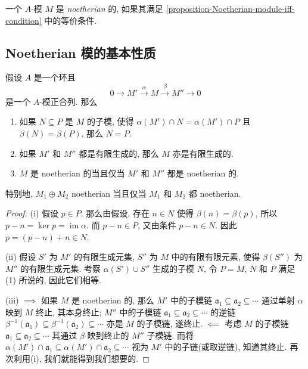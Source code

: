 一个 \( A \)-模 \( M \) 是 \emph{noetherian} 的, 如果其满足
\cref{proposition-Noetherian-module-iff-condition} 中的等价条件.

\subsection{Noetherian 模的基本性质}

\begin{proposition}
  \label{proposition-exact-sequence-noetherian-module}
  假设 \( A \) 是一个环且
  \[
    0 \to M' \xrightarrow{\alpha} M \xrightarrow{\beta} M'' \to 0
  \]
  是一个 \( A \)-模正合列. 那么
  \begin{enumerate}
    \item 如果 \( N \subseteq P \) 是 \( M \) 的子模, 使得 \( \alpha(M') \cap N
      = \alpha(M') \cap P \) 且 \( \beta(N) = \beta(P) \), 那么 \( N = P \).
    \item 如果 \( M' \) 和 \( M'' \) 都是有限生成的, 那么 \( M \)
      亦是有限生成的.
    \item \( M \) 是 noetherian 的当且仅当 \( M' \) 和 \( M'' \) 都是 noetherian
      的.
  \end{enumerate}
  特别地, \( M_1 \oplus M_2 \) noetherian 当且仅当 \( M_1 \) 和 \( M_2 \) 都
  noetherian.
\end{proposition}
\begin{proof}
  (i) 假设 \( p \in P \). 那么由假设, 存在 \( n \in N \) 使得 \( \beta(n) =
  \beta(p) \), 所以 \( p - n = \operatorname{ker} p = \operatorname{im} \alpha
  \). 而 \( p - n \in P \), 又由条件 \( p - n \in N \). 因此 \( p = (p - n) + n
  \in N \).

  (ii) 假设 \( S' \) 为 \( M' \) 的有限生成元集,
  \( S'' \) 为 \( M \) 中的有限有限元素, 使得 \( \beta (S'') \) 为 \( M'' \)
  的有限生成元集.
  考察 \( \alpha(S') \cup S'' \) 生成的子模 \( N \), 令 \( P = M \), \( N \) 和
  \( P \) 满足 (1) 所说的, 因此它们相等.

  (iii) \( \implies \) 如果 \( M \) 是 noetherian 的, 那么 \( M' \) 中的子模链
  \( \mathfrak{a}_1 \subseteq \mathfrak{a}_2 \subseteq \cdots \) 通过单射 \(
  \alpha \) 映到 \( M \) 终止, 其本身终止; \( M'' \) 中的子模链 \(
  \mathfrak{a}_1 \subseteq \mathfrak{a}_2 \subseteq \cdots \) 的逆链 \(
  \beta^{-1}(\mathfrak{a}_1) \subseteq \beta^{-1}(\mathfrak{a}_2) \subseteq
  \cdots \) 亦是 \( M \) 的子模链, 遂终止. \( \impliedby \) 考虑 \( M \)
  的子模链 \( \mathfrak{a}_1 \subseteq \mathfrak{a}_2 \subseteq \cdots \) 其通过
  \( \beta \) 映到终止的 \( M'' \) 子模链. 而将 \( \alpha(M') \cap
  \mathfrak{a}_1 \subseteq \alpha(M') \cap \mathfrak{a}_2 \subseteq \cdots \)
  视为 \( M' \) 中的子链(或取逆链), 知道其终止. 再次利用(i),
  我们就能得到我们想要的.
\end{proof}


